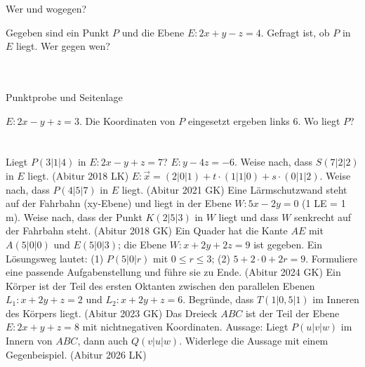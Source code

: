 \setcounter{aufgabe}{8}

\begin{aufgabe}{Wer und wogegen?}
\begin{teile}
\teil Gegeben sind ein Punkt $P$ und die Ebene $E: 2x + y - z = 4$. Gefragt ist, ob $P$ in $E$ liegt. Wer gegen wen? \\  \\  \\ 
\end{teile}
\end{aufgabe}

\begin{aufgabe}{Punktprobe und Seitenlage}
\begin{teile}
\teil $E: 2x - y + z = 3$. Die Koordinaten von $P$ eingesetzt ergeben links $6$. Wo liegt $P$? \\  \\  \\ 
\teil Liegt $P(3 | 1 | 4)$ in $E: 2x - y + z = 7$?
\teil $E: y - 4z = -6$. Weise nach, dass $S(7 | 2 | 2)$ in $E$ liegt. \hfill (Abitur 2018 LK)
\teil $E: \vec{x} = (2 | 0 | 1) + t \cdot (1 | 1 | 0) + s \cdot (0 | 1 | 2)$. Weise nach, dass $P(4 | 5 | 7)$ in $E$ liegt. \hfill (Abitur 2021 GK)
\teil Eine Lärmschutzwand steht auf der Fahrbahn (xy-Ebene) und liegt in der Ebene $W: 5x - 2y = 0$ (1 LE = 1 m). Weise nach, dass der Punkt $K(2 | 5 | 3)$ in $W$ liegt und dass $W$ senkrecht auf der Fahrbahn steht. \hfill (Abitur 2018 GK)
\teil Ein Quader hat die Kante $AE$ mit $A(5 | 0 | 0)$ und $E(5 | 0 | 3)$; die Ebene $W: x + 2y + 2z = 9$ ist gegeben. Ein Lösungsweg lautet: (1) $P(5 | 0 | r)$ mit $0 \le r \le 3$; (2) $5 + 2 \cdot 0 + 2r = 9$. Formuliere eine passende Aufgabenstellung und führe sie zu Ende. \hfill (Abitur 2024 GK)
\teil Ein Körper ist der Teil des ersten Oktanten zwischen den parallelen Ebenen $L_1: x + 2y + z = 2$ und $L_2: x + 2y + z = 6$. Begründe, dass $T(1 | 0{,}5 | 1)$ im Inneren des Körpers liegt. \hfill (Abitur 2023 GK)
\teil Das Dreieck $ABC$ ist der Teil der Ebene $E: 2x + y + z = 8$ mit nichtnegativen Koordinaten. Aussage: Liegt $P(u | v | w)$ im Innern von $ABC$, dann auch $Q(v | u | w)$. Widerlege die Aussage mit einem Gegenbeispiel. \hfill (Abitur 2026 LK)
\end{teile}
\end{aufgabe}

